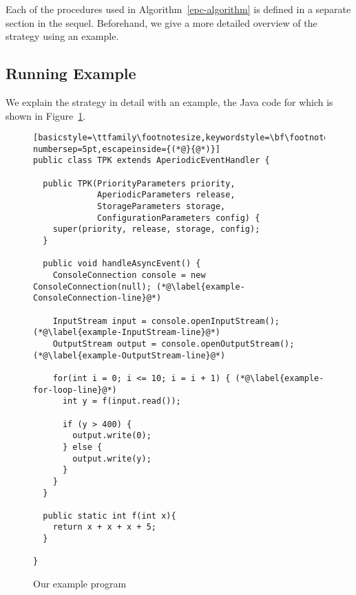 Each of the procedures used in Algorithm~\ref{epc-algorithm} is
defined in a separate section in the sequel.
Beforehand, we give a more detailed overview of the strategy using an
example.

\subsection{Running Example}
\label{overview-subsection}

We explain the strategy in detail with an example, the Java code for
which is shown in Figure~\ref{example-code-figure}.
\begin{figure}[t!]
  \begin{center}
  \begin{minipage}{12cm}
  \begin{lstlisting}[basicstyle=\ttfamily\footnotesize,keywordstyle=\bf\footnotesize,language=Java,numbers=left,numberstyle=\tiny,stepnumber=1, numbersep=5pt,escapeinside={(*@}{@*)}]
public class TPK extends AperiodicEventHandler {

  public TPK(PriorityParameters priority,
             AperiodicParameters release,
             StorageParameters storage,
             ConfigurationParameters config) {
    super(priority, release, storage, config);
  }
      
  public void handleAsyncEvent() {
    ConsoleConnection console = new ConsoleConnection(null); (*@\label{example-ConsoleConnection-line}@*)
        
    InputStream input = console.openInputStream(); (*@\label{example-InputStream-line}@*)
    OutputStream output = console.openOutputStream(); (*@\label{example-OutputStream-line}@*)
        
    for(int i = 0; i <= 10; i = i + 1) { (*@\label{example-for-loop-line}@*)
      int y = f(input.read());
          
      if (y > 400) {
        output.write(0);
      } else {
        output.write(y);
      }
    }
  }
      
  public static int f(int x){
    return x + x + x + 5;
  }
      
}
\end{lstlisting}
\end{minipage}
\end{center}
  \caption{Our example program}
  \label{example-code-figure}
\end{figure}
